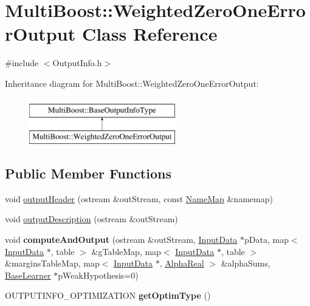\hypertarget{classMultiBoost_1_1WeightedZeroOneErrorOutput}{\section{Multi\-Boost\-:\-:Weighted\-Zero\-One\-Error\-Output Class Reference}
\label{classMultiBoost_1_1WeightedZeroOneErrorOutput}
}


{\ttfamily \#include $<$Output\-Info.\-h$>$}

Inheritance diagram for Multi\-Boost\-:\-:Weighted\-Zero\-One\-Error\-Output\-:\begin{figure}[H]
\begin{center}
\leavevmode
\includegraphics[height=2.000000cm]{classMultiBoost_1_1WeightedZeroOneErrorOutput}
\end{center}
\end{figure}
\subsection*{Public Member Functions}
\begin{DoxyCompactItemize}
\item 
void \hyperlink{classMultiBoost_1_1WeightedZeroOneErrorOutput_af3bb173deec1f443a8f1b8c9d709e269}{output\-Header} (ostream \&out\-Stream, const \hyperlink{classMultiBoost_1_1NameMap}{Name\-Map} \&namemap)
\item 
void \hyperlink{classMultiBoost_1_1WeightedZeroOneErrorOutput_aec75d32d115c03d52f281fd4c47e3478}{output\-Description} (ostream \&out\-Stream)
\item 
\hypertarget{classMultiBoost_1_1WeightedZeroOneErrorOutput_ab6347501509e7a9e6cffbd101b277235}{void {\bfseries compute\-And\-Output} (ostream \&out\-Stream, \hyperlink{classMultiBoost_1_1InputData}{Input\-Data} $\ast$p\-Data, map$<$ \hyperlink{classMultiBoost_1_1InputData}{Input\-Data} $\ast$, table $>$ \&g\-Table\-Map, map$<$ \hyperlink{classMultiBoost_1_1InputData}{Input\-Data} $\ast$, table $>$ \&margins\-Table\-Map, map$<$ \hyperlink{classMultiBoost_1_1InputData}{Input\-Data} $\ast$, \hyperlink{Defaults_8h_a80184c4fd10ab70a1a17c5f97dcd1563}{Alpha\-Real} $>$ \&alpha\-Sums, \hyperlink{classMultiBoost_1_1BaseLearner}{Base\-Learner} $\ast$p\-Weak\-Hypothesis=0)}\label{classMultiBoost_1_1WeightedZeroOneErrorOutput_ab6347501509e7a9e6cffbd101b277235}

\item 
\hypertarget{classMultiBoost_1_1WeightedZeroOneErrorOutput_ae841fb3f56ff5e3cd963c7fa5ce99540}{O\-U\-T\-P\-U\-T\-I\-N\-F\-O\-\_\-\-O\-P\-T\-I\-M\-I\-Z\-A\-T\-I\-O\-N {\bfseries get\-Optim\-Type} ()}\label{classMultiBoost_1_1WeightedZeroOneErrorOutput_ae841fb3f56ff5e3cd963c7fa5ce99540}

\end{DoxyCompactItemize}
